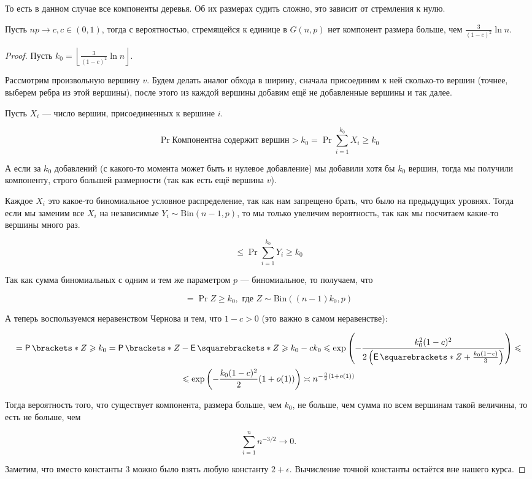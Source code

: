 То есть в данном случае все компоненты деревья. Об их размерах судить сложно,
это зависит от стремления к нулю.

\begin{lemma}
  Пусть $np \to c, c \in (0, 1)$, тогда с вероятностью, стремящейся к единице
  в $G(n, p)$ нет компонент размера больше, чем $\frac{3}{(1 - c)^2}\ln n$.
\end{lemma}

\begin{proof}
  Пусть $k_0 = \left\lfloor \frac{3}{(1 - c)^2} \ln n \right\rfloor$.

  Рассмотрим произвольную вершину $v$. Будем делать аналог обхода в ширину,
  сначала присоединим к ней сколько-то вершин (точнее, выберем ребра из этой вершины),
  после этого из каждой вершины добавим ещё не добавленные вершины и так далее.

  Пусть $X_i$ --- число вершин, присоединенных к вершине $i$.

  \[
    \Pr{\text{Компонентна содержит вершин} > k_0} = \Pr{\sum\limits_{i = 1}^{k_0} X_i \geq k_0}
  \]

  А если за $k_0$ добавлений (с какого-то
  момента может быть и нулевое добавление) мы добавили хотя бы $k_0$ вершин,
  тогда мы получили компоненту, строго большей размерности (так как есть
  ещё вершина $v$).

  Каждое $X_i$ это какое-то биномиальное условное распределение, так как нам
  запрещено брать, что было на предыдущих уровнях. Тогда если мы заменим все
  $X_i$ на независимые $Y_i \sim \mathrm{Bin}(n - 1, p)$, то мы только увеличим вероятность,
  так как мы посчитаем какие-то вершины много раз.

  \[
    \leq \Pr{\sum\limits_{i = 1}^{k_0} Y_i \geq k_0}
  \]

  Так как сумма биномиальных с одним и тем же параметром $p$ --- биномиальное,
  то получаем, что

  \[
    = \Pr{Z \geq k_0}, \text{ где } Z \sim \mathrm{Bin}((n - 1)k_0, p)
  \]

  А теперь воспользуемся неравенством Чернова и тем, что $1 - c > 0$ (это важно
  в самом неравенстве):

  \begin{multline}
    = \Pr{Z \geq k_0} = \Pr{Z - \E{Z} \geq k_0 - ck_0} \leq
    \exp\left(-\frac{k_0^2(1 - c)^2}{2\left(\E{Z} + \frac{k_0(1 - c)}{3}\right)}\right)
    \leq\\\leq \exp\left(-\frac{k_0(1 - c)^2}{2}(1 + o(1))\right) \asymp n^{-\frac{3}{2}(1 + o(1))}
  \end{multline}

  Тогда вероятность того, что существует компонента, размера больше, чем $k_0$,
  не больше, чем сумма по всем вершинам такой величины, то есть не больше, чем

  \[
    \sum\limits_{i = 1}^n n^{-3/2} \to 0.
  \]

  Заметим, что вместо константы $3$ можно было взять любую константу $2 + \epsilon$.
  Вычисление точной константы остаётся вне нашего курса.
\end{proof}


